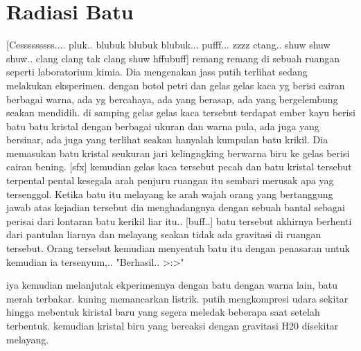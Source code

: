 \chapter{Radiasi Batu}

[Cesssssssss.... pluk.. blubuk blubuk blubuk... pufff... zzzz ctang.. shuw shuw shuw.. clang clang tak clang shuw hffubuff] 
remang remang di sebuah ruangan seperti laboratorium kimia. 
Dia mengenakan jass putih terlihat sedang melakukan eksperimen. 
dengan botol petri dan gelas gelas kaca yg berisi cairan berbagai warna, ada yg bercahaya, ada yang berasap, ada yang bergelembung seakan mendidih. 
di samping gelas gelas kaca tersebut terdapat ember kayu berisi batu batu kristal dengan berbagai ukuran dan warna pula, ada juga yang bersinar, ada juga yang terlihat seakan hanyalah kumpulan batu krikil. 
Dia memasukan batu kristal seukuran jari kelingngking berwarna biru ke gelas berisi cairan bening. 
[sfx] 
kemudian gelas kaca tersebut pecah dan batu kristal tersebut terpental pental kesegala arah penjuru ruangan itu sembari merusak apa yag tersenggol. 
Ketika batu itu melayang ke arah wajah orang yang bertanggung jawab atas kejadian tersebut dia menghadangnya dengan sebuah bantal sebagai perisai dari lontaran batu kerikil liar itu.. 
[buff..]
batu tersebut akhirnya berhenti dari pantulan liarnya dan melayang seakan tidak ada gravitasi di ruangan tersebut. 
Orang tersebut kemudian menyentuh batu itu dengan penasaran untuk kemudian ia tersenyum,.. 
"Berhasil.. >:>"

iya kemudian melanjutak ekperimennya dengan batu dengan warna lain, batu merah terbakar. kuning memancarkan listrik. putih mengkompresi udara sekitar hingga mebentuk kiristal baru yang segera meledak beberapa saat setelah terbentuk. kemudian kristal biru yang bereaksi dengan gravitasi H20 disekitar melayang.